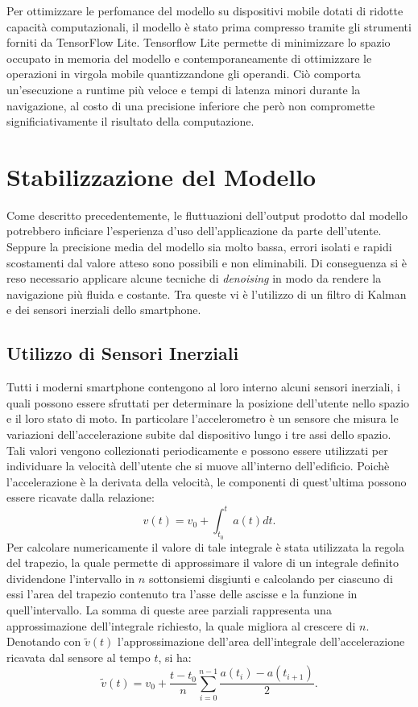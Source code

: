 Per ottimizzare le perfomance del modello su dispositivi mobile dotati di
ridotte capacità computazionali, il modello è stato prima compresso tramite
gli strumenti forniti da TensorFlow Lite\cite{tensorflow-lite}. Tensorflow Lite
permette di minimizzare lo spazio occupato in memoria del modello e
contemporaneamente di ottimizzare le operazioni in virgola mobile
quantizzandone gli operandi. Ciò comporta un'esecuzione a runtime più veloce e
tempi di latenza minori durante la navigazione, al costo di una precisione
inferiore che però non compromette significiativamente il risultato della
computazione.
\section{Stabilizzazione del Modello}
Come descritto precedentemente, le fluttuazioni dell'output prodotto dal
modello potrebbero inficiare l'esperienza d'uso dell'applicazione da parte
dell'utente. Seppure la precisione media del modello sia molto bassa, errori
isolati e rapidi scostamenti dal valore atteso sono possibili e non
eliminabili. Di conseguenza si è reso necessario applicare alcune tecniche di
\emph{denoising} in modo da rendere la navigazione più fluida e costante. Tra
queste vi è l'utilizzo di un filtro di Kalman e dei sensori inerziali dello
smartphone.
\subsection{Utilizzo di Sensori Inerziali}
Tutti i moderni smartphone contengono al loro interno alcuni sensori inerziali,
i quali possono essere sfruttati per determinare la posizione dell'utente nello
spazio e il loro stato di moto. In particolare l'accelerometro è un sensore che
misura le variazioni dell'accelerazione subite dal dispositivo lungo i tre assi
dello spazio. Tali valori vengono collezionati periodicamente e possono essere
utilizzati per individuare la velocità dell'utente che si muove all'interno
dell'edificio. Poichè l'accelerazione è la derivata della velocità, le
componenti di quest'ultima possono essere ricavate dalla relazione:
\[v(t) = v_0 + \int_{t_0}^t{a(t) dt}. \]
Per calcolare numericamente il valore di tale integrale è stata utilizzata la
regola del trapezio, la quale permette di approssimare il valore di un
integrale definito dividendone l'intervallo in \(n\) sottonsiemi disgiunti e
calcolando per ciascuno di essi l'area del trapezio contenuto tra l'asse delle
ascisse e la funzione in quell'intervallo. La somma di queste aree parziali
rappresenta una approssimazione dell'integrale richiesto, la quale migliora al
crescere di \(n\). Denotando con \(\tilde{v}(t)\) l'approssimazione dell'area
dell'integrale dell'accelerazione ricavata dal sensore al tempo \(t\), si ha:
\[ \tilde{v}(t) = 
  v_0 + \frac{t - t_0}{n} \sum_{i=0}^{n-1} {\frac{a(t_i) - a(t_{i+1})}{2}}. \]

